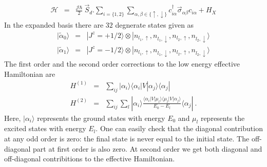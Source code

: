 \documentclass[reprint,prb,superscriptaddress]{revtex4-2}
\begin{document}
\begin{eqnarray}
\mathcal{H} &=& \frac{{\mathcal{J}}\hbar}{2}~ \vec{S}_d. \displaystyle\sum_{i=\{1,2\}} \displaystyle\sum_{\alpha,\beta\in\{\uparrow,\downarrow\}}c_{i\alpha}^{\dagger} \vec{\sigma}_{\alpha\beta} c_{i\alpha} +H_X
\label{eq:excitation_hamiltonian}
\end{eqnarray}
In the expanded basis there are $32$ degnerate states given as 
\begin{eqnarray}
|\tilde{\alpha}_0\rangle &=&|J^z=+1/2\rangle\otimes |n_{l_1,\uparrow},n_{l_1,\downarrow},n_{l_2,\uparrow},n_{l_2,\downarrow}\rangle \\
|\tilde{\alpha}_1\rangle &=& |J^z=-1/2 \rangle\otimes |n_{l_1,\uparrow},n_{l_1,\downarrow},n_{l_2,\uparrow},n_{l_2,\downarrow}\rangle
\end{eqnarray}
The first order and the second order corrections to the low energy effective Hamiltonian are
\begin{eqnarray}
H^{(1)} &=& \sum_{ij} |\alpha_i\rangle \langle \alpha_i  | V| \alpha_j \rangle \langle \alpha_j |~\nonumber\\
H^{(2)} &=& \sum_{ij} \sum_l |\alpha_i\rangle \frac{\langle \alpha_i  | V| \mu_l \rangle \langle \mu_l  | V| \alpha_j \rangle}{E_0-E_{l}}\langle \alpha_j |~.
\end{eqnarray}
Here, $|\alpha_i\rangle$ represents the ground states with energy $E_0$ and $\mu_l$ represents the excited states with energy $E_l$. One can easily check that the diagonal contribution at any odd order is zero: the final state is never equal to the initial state. The off-diagonal part at first order is also zero. At second order we get both diagonal and off-diagonal contribitions to the effective Hamiltonian. 
\end{document}
